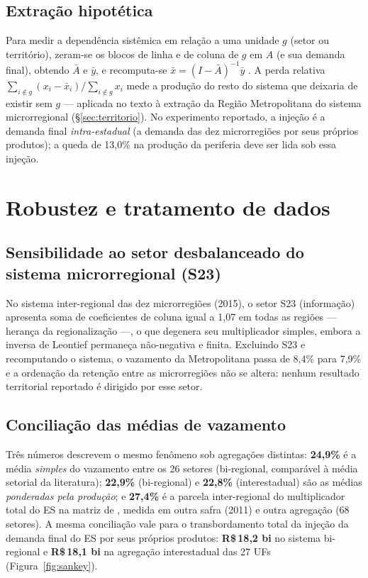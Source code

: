 \documentclass[11pt,a4paper]{article}
\begin{document}
\subsection{Extração hipotética}
\label{ap:hem}
Para medir a dependência sistêmica em relação a uma unidade $g$ (setor ou território),
zeram-se os blocos de linha e de coluna de $g$ em $A$ (e sua demanda final), obtendo
$\bar{A}$ e $\bar{y}$, e recomputa-se $\bar{x}=(I-\bar{A})^{-1}\bar{y}$
\citep{dietzenbacher1993,millerblair2009}. A perda relativa
$\sum_{i\notin g}(x_i-\bar{x}_i)\big/\sum_{i\notin g}x_i$ mede a produção do resto do
sistema que deixaria de existir sem $g$ --- aplicada no texto à extração da Região
Metropolitana do sistema microrregional (\S\ref{sec:territorio}). No experimento reportado,
a injeção é a demanda final \emph{intra-estadual} (a demanda das dez microrregiões por seus
próprios produtos); a queda de 13,0\% na produção da periferia deve ser lida sob essa
injeção.

\section{Robustez e tratamento de dados}
\label{ap:robustez}

\subsection{Sensibilidade ao setor desbalanceado do sistema microrregional (S23)}
\label{ap:s23}
No sistema inter-regional das dez microrregiões (2015), o setor S23 (informação) apresenta
soma de coeficientes de coluna igual a 1,07 em todas as regiões --- herança da
regionalização ---, o que degenera seu multiplicador simples, embora a inversa de Leontief
permaneça não-negativa e finita. Excluindo S23 e recomputando o sistema, o vazamento da
Metropolitana passa de 8,4\% para 7,9\% e a ordenação da retenção entre as microrregiões
não se altera: nenhum resultado territorial reportado é dirigido por esse setor.

\subsection{Conciliação das médias de vazamento}
\label{ap:medias}
Três números descrevem o mesmo fenômeno sob agregações distintas: \textbf{24,9\%} é a média
\emph{simples} do vazamento entre os 26 setores (bi-regional, comparável à média setorial
da literatura); \textbf{22,9\%} (bi-regional) e \textbf{22,8\%} (interestadual) são as
médias \emph{ponderadas pela produção}; e \textbf{27,4\%} é a parcela inter-regional do
multiplicador total do ES na matriz de \citet{haddad2017iioas}, medida em outra safra
(2011) e outra agregação (68 setores). A mesma conciliação vale para o transbordamento
total da injeção da demanda final do ES por seus próprios produtos: \textbf{R\$\,18,2 bi}
no sistema bi-regional e \textbf{R\$\,18,1 bi} na agregação interestadual das 27 UFs
(Figura~\ref{fig:sankey}).
\end{document}
